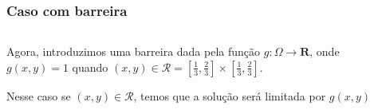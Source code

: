 \documentclass[xcolor=dvipsnames, aspectratio=169]{beamer}
\begin{document}
    \begin{frame}
        \frametitle{Caso com barreira}
        \begin{columns}
            \begin{column}{0.6\textwidth}
                Agora, introduzimos uma barreira dada pela função $g : \Omega \to \mathbf{R}$, onde $g(x,y) = 1$ quando $(x,y) \in \mathcal R = \left[ \frac{1}{3}, \frac{2}{3} \right] \times \left[ \frac{1}{3}, \frac{2}{3} \right]$.

                \medskip

                Nesse caso se $(x,y) \in \mathcal R$, temos que a solução será limitada por $g(x,y)$
            \end{column}
            \begin{column}{0.4\textwidth}
                \begin{center}
                \end{center}
            \end{column}
        \end{columns}
    \end{frame}
\end{document}
